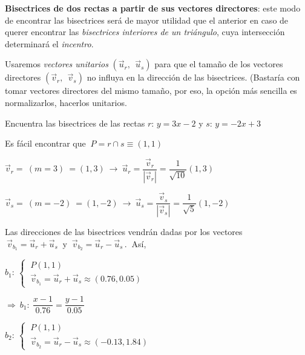 \vspace{5mm}
\begin{cuadro-naranja}

\textbf{Bisectrices de dos rectas a partir de sus vectores directores}: este modo de encontrar las bisectrices será de mayor utilidad que el anterior en caso de querer encontrar las \emph{bisectrices interiores de un triángulo}, cuya intersección determinará el \emph{incentro}.

Usaremos \emph{vectores unitarios} $(\vec u_r,\ \ \vec u_s)$ para que el tamaño de los vectores directores $(\vec v_r,\ \ \vec v_s)$ no influya en la dirección de las bisectrices. (Bastaría con tomar vectores directores del mismo tamaño, por eso, la opción más sencilla es normalizarlos, hacerlos unitarios.

\begin{miejemplo}

Encuentra las bisectrices de las rectas $r:\, y=3x-2$ y $s:\, y=-2x+3$

\vspace{5mm} Es fácil encontrar que $\ P=r\cap s\equiv(1,1)$

\vspace{2mm} $\vec v_r=\ (m=3)\ =(1,3) \ \to \ \vec u_r=\dfrac{\vec v_r}{|\vec v_r|}=\dfrac {1}{\sqrt{10}} (1,3)$

\vspace{2mm} $\vec v_s=\ (m=-2)\ =(1,-2) \ \to \ \vec u_s=\dfrac{\vec v_s}{|\vec v_s|}=\dfrac {1}{\sqrt{5}} (1,-2)$

\vspace{2mm} Las direcciones de las bisectrices vendrán dadas por los vectores $\ \vec v_{b_1}=\vec u_r+\vec u_s \ \text{ y } \ \vec v_{b_2}=\vec u_r-\vec u_s\, . \ $ Así,

\begin{multicols}{2}
\vspace{2mm} $b_1:\ \begin{cases} \ P(1,1) \\ \ \vec v_{b_1}=\vec u_r+\vec u_s\approx (0.76,0.05) \end{cases}$

\vspace{3mm}$ \Rightarrow \ b_1:\ \dfrac{x-1}{0.76}=\dfrac{y-1}{0.05}$

\vspace{6mm} $b_2:\ \begin{cases} \ P(1,1) \\ \ \vec v_{b_2}=\vec u_r-\vec u_s\approx (-0.13,1.84) \end{cases} $


\end{multicols}
\end{miejemplo}
\end{cuadro-naranja}
